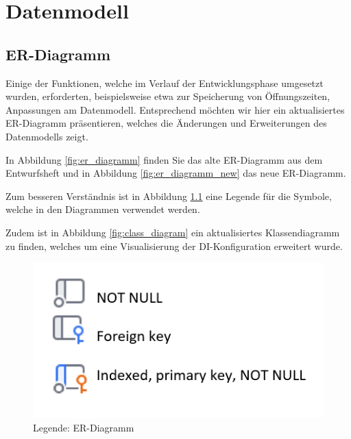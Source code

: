 
\chapter{Datenmodell}
\label{ch:datamodel}

\section{ER-Diagramm}

Einige der Funktionen, welche im Verlauf der Entwicklungsphase umgesetzt wurden,
erforderten, beispielsweise etwa zur Speicherung von Öffnungszeiten, Anpassungen am Datenmodell.
Entsprechend möchten wir hier ein aktualisiertes ER-Diagramm präsentieren, welches die Änderungen und Erweiterungen des Datenmodells zeigt.

In Abbildung \ref{fig:er_diagramm} finden Sie das alte ER-Diagramm aus dem Entwurfsheft und in Abbildung \ref{fig:er_diagramm_new} das neue ER-Diagramm.

Zum besseren Verständnis ist in Abbildung \ref{fig:er_diagramm_legend} eine Legende für die Symbole, welche in den Diagrammen verwendet werden.

Zudem ist in Abbildung \ref{fig:class_diagram} ein aktualisiertes Klassendiagramm zu finden, welches um eine Visualisierung der DI-Konfiguration erweitert wurde.

\begin{figure}[ht]
    \centering
    \includegraphics[width=\textwidth]{figures/ERLegend}
    \caption{Legende: ER-Diagramm}
    \label{fig:er_diagramm_legend}
\end{figure}

